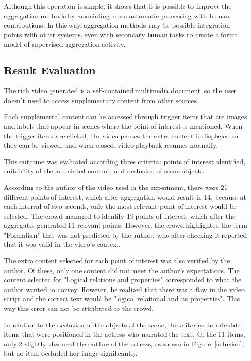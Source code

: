 Although this operation is simple, it shows that it is possible to improve the aggregation methods by associating more automatic processing with human contributions. In this way, aggregation methods may be possible integration points with other systems, even with secondary human tasks to create a formal model of supervised aggregation activity.

\pagebreak


\subsection{Result Evaluation}
The rich video generated is a self-contained multimedia document, so the user doesn't need to access supplementary content from other sources.

Each supplemental content can be accessed through trigger items that are images and labels that appear in scenes where the point of interest is mentioned. When the trigger items are clicked, the video pauses the extra content is displayed so they can be viewed, and when closed, video playback resumes normally.

This outcome was evaluated according three criteria: points of interest identified, suitability of the associated content, and occlusion of scene objects.

According to the author of the video used in the experiment, there were 21 different points of interest, which after aggregation would result in 14, because at each interval of two seconds, only the most relevant point of interest would be selected. The crowd managed to identify 19 points of interest, which after the aggregates generated 11 relevant points. However, the crowd highlighted the term "Formalism" that  was not predicted by the author, who after checking it reported that it was valid in the video's context.

The extra content selected for each point of interest was also verified by the author. Of these, only one content did not meet the author's expectations. The content selected for "Logical relations and properties" corresponded to what the author wanted to convey. However, he realized that there was a flaw in the video script and the correct text would be "logical relational and its properties". This way this error can not be attributed to the crowd.

In relation to the occlusion of the objects of the scene, the criterion to calculate items that were positioned in the actress who narrated the text. Of the 11 items, only 2 slightly obscured the outline of the actress, as shown in Figure~\ref{oclusion}, but no item occluded her image significantly.

